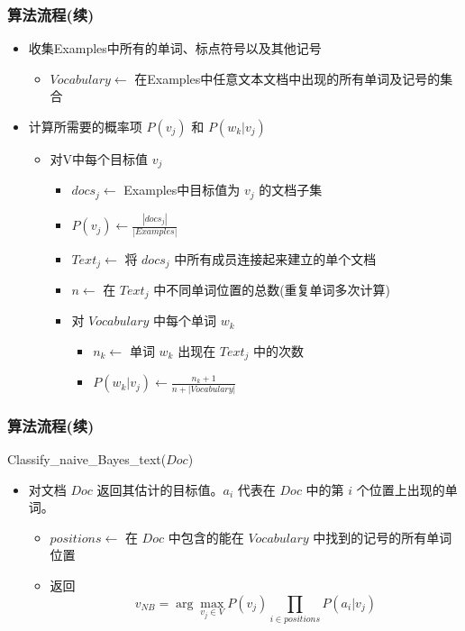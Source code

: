 \documentclass{beamer}
\begin{document}
\begin{frame}
\frametitle{算法流程(续)}
\label{sec-9-5}

\begin{itemize}
\item 收集Examples中所有的单词、标点符号以及其他记号
\begin{itemize}
\item $Vocabulary \leftarrow$ 在Examples中任意文本文档中出现的所有单词及记号的集合
\end{itemize}
\item 计算所需要的概率项 $P(v_j)$ 和 $P(w_k|v_j)$
\begin{itemize}
\item 对V中每个目标值 $v_j$
\begin{itemize}
\item $docs_{j} \leftarrow$ Examples中目标值为 $v_j$ 的文档子集
\item $P(v_{j}) \leftarrow \frac{|docs_{j}|}{|Examples|}$
\item $Text_{j} \leftarrow$ 将 $docs_j$ 中所有成员连接起来建立的单个文档
\item $n \leftarrow$ 在 $Text_j$ 中不同单词位置的总数(重复单词多次计算)
\item 对 $Vocabulary$ 中每个单词 $w_k$
\begin{itemize}
\item $n_{k} \leftarrow$ 单词 $w_k$ 出现在 $Text_j$ 中的次数
\item $P(w_{k}|v_{j}) \leftarrow \frac{n_{k} + 1}{n + |Vocabulary|}$
\end{itemize}
\end{itemize}
\end{itemize}
\end{itemize}
\end{frame}
\begin{frame}
\frametitle{算法流程(续)}
\label{sec-9-6}

Classify\_{}naive\_{}Bayes\_{}text($Doc$)
\begin{itemize}
\item 对文档 $Doc$ 返回其估计的目标值。$a_i$ 代表在 $Doc$ 中的第 $i$ 个位置上出现的单词。
\begin{itemize}
\item $positions \leftarrow$ 在 $Doc$ 中包含的能在 $Vocabulary$ 中找到的记号的所有单词位置
\item 返回
     $$v_{NB} = \arg\max_{v_{j} \in V} P(v_{j}) \prod_{i \in positions}P(a_{i}|v_{j})$$
\end{itemize}
\end{itemize}
\end{frame}
\end{document}
